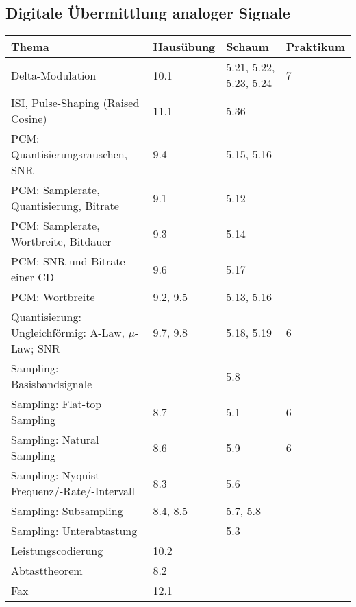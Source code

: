 \subsection{Digitale Übermittlung analoger Signale}
	\begin{tabular}{|p{9cm}|p{2.5cm}|p{3.5cm}|p{2cm}|}
	\hline
	\textbf{Thema} & \textbf{Hausübung} & \textbf{Schaum} & \textbf{Praktikum} \\ \hline
	Delta-Modulation & 10.1 & 5.21, 5.22, 5.23, 5.24 & 7 \\ \hline
	ISI, Pulse-Shaping (Raised Cosine) & 11.1 & 5.36 &  \\ \hline
	PCM: Quantisierungsrauschen, SNR & 9.4 & 5.15, 5.16 &  \\ \hline
	PCM: Samplerate, Quantisierung, Bitrate & 9.1 & 5.12 &  \\ \hline
	PCM: Samplerate, Wortbreite, Bitdauer & 9.3 & 5.14 &  \\ \hline
	PCM: SNR und Bitrate einer CD & 9.6 & 5.17 &  \\ \hline
	PCM: Wortbreite & 9.2, 9.5 & 5.13, 5.16 &  \\ \hline
	Quantisierung: Ungleichförmig: A-Law, $\mu$-Law; SNR & 9.7, 9.8 & 5.18, 5.19
	& 6 \\ \hline Sampling: Basisbandsignale & & 5.8 &  \\ \hline
	Sampling: Flat-top Sampling & 8.7 & 5.1 & 6 \\ \hline
	Sampling: Natural Sampling & 8.6 & 5.9 & 6 \\ \hline
	Sampling: Nyquist-Frequenz/-Rate/-Intervall & 8.3 & 5.6 &  \\ \hline
	Sampling: Subsampling & 8.4, 8.5 & 5.7, 5.8 &  \\ \hline
	Sampling: Unterabtastung & & 5.3 &  \\ \hline
	Leistungscodierung & 10.2 && \\ \hline
	Abtasttheorem & 8.2 & & \\ \hline
	Fax & 12.1 & & \\ \hline
	\end{tabular}
